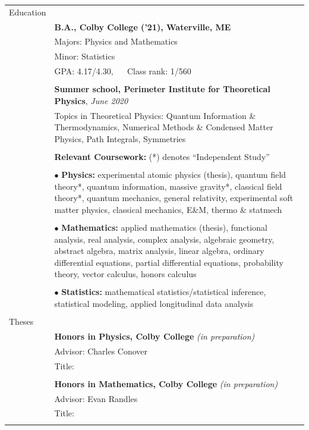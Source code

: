 \documentclass[10pt]{article}
\begin{document}
\noindent \begin{longtable}{ l p{14.5cm}   }

	
  \large{Education}    	& \\ 
  						& \textbf{B.A., Colby College ('21), Waterville, ME} \\
     				 	& Majors: Physics and Mathematics \\
     				 	& Minor: Statistics  \\
     					& GPA: 4.17/4.30, $\quad$ Class rank: 1/560 \\
	 					& \\ 

	 					&\textbf{Summer school, Perimeter Institute for Theoretical Physics}, \textit{June 2020} \\
	 					& Topics in Theoretical Physics: Quantum Information \& Thermodynamics, Numerical Methods \& Condensed Matter Physics, Path Integrals, Symmetries \\
	 					&\\
	 					
	 					& \textbf{Relevant Coursework:} (*) denotes ``Independent Study'' \\ \vspace{-12pt}
	 					& \\
	 					& $\bullet$ \textbf{Physics:} experimental atomic physics (thesis), quantum field theory*, quantum information, massive gravity*, classical field theory*, quantum mechanics,  general relativity, experimental soft matter physics, classical mechanics, E\&M, thermo \& statmech\\  \vspace{-9pt}
	 					& \\
	 					& $\bullet$ \textbf{Mathematics:} applied mathematics (thesis), functional analysis, real analysis, complex analysis, algebraic geometry, abstract algebra, matrix analysis, linear algebra, ordinary differential equations, partial differential equations, probability theory, vector calculus, honors calculus\\   \vspace{-9pt}
	 					& \\ 
	 					& $\bullet$ \textbf{Statistics:} mathematical statistics/statistical inference,  statistical modeling, applied longitudinal data analysis\\
	 					& \\
	 					
	 					

\large{Theses}
&\\
& \textbf{Honors in Physics, Colby College} \textit{(in preparation)}\\
& Advisor: Charles Conover\\
& Title: \\
& \\
& \textbf{Honors in Mathematics, Colby College} \textit{(in preparation)}\\
& Advisor: Evan Randles\\
& Title: \\
&\\ 
    

\end{longtable}
\end{document}

